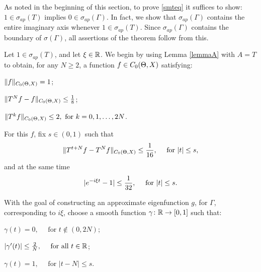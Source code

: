 \begin{pf} As noted in the beginning of this section,  to prove
\eqref{smteq} it suffices to show: $1\in\sigma_{ap}(T)$ implies
$0\in\sigma_{ap}(\Gamma)$.  In fact, we show that
$\sigma_{ap}(\Gamma)$ contains the entire imaginary axis
whenever $1\in\sigma_{ap}(T)$.  Since $\sigma_{ap}(\Gamma)$
contains the boundary of $\sigma(\Gamma)$, all assertions of
the theorem follow from this.

Let $1\in\sigma_{ap}(T)$, and let $\xi\in{\Bbb{R}}$.  We begin by using
Lemma \ref{lemmaA} with $A=T$ to obtain, for any $N\ge 2$, a function
$f\in C_0(\Theta,X)$ satisfying:
\addtocounter{equation}{1}  %
\begin{list}{(\theequation{})}{}
\item $\|f\|_{C_0(\Theta,X)} =1$;
\item $\|T^Nf-f\|_{C_0(\Theta,X)} \le {1\over 8}$;
\item $\|T^kf\|_{C_0(\Theta,X)} \le 2,\text{ for } k=0,1,\ldots,2N$.
\end{list}
For this $f$, fix $s\in (0,1)$ such that
\begin{equation}\lb{SMT-2}
\|T^{t+N}f-T^Nf\|_{\co}\le{1\over 16},\quad\text{ for }|t| \le s,
\end{equation}
and at the same time
\begin{equation}\lb{SMT-3}
|e^{-i\xi t}-1|\le{1\over 32},\quad\text{ for }|t| \le s.
\end{equation}


With the goal of constructing an approximate eigenfunction $g$,
for $\Gamma$, corresponding to $i\xi$, choose a smooth
function $\gamma\colon{\Bbb{R}}\to[0,1]$
such that:
\addtocounter{equation}{1} %
\begin{list}{(\theequation{})}{}
\item $\gamma(t) = 0, \quad\text{ for } t\notin (0,2N)$;
\item $|\gamma'(t)|\le {2\over N}, \quad\text{ for all } t\in{\Bbb{R}}$;
\item $\gamma(t) =1, \quad\text{ for } |t-N|\le s$.
\end{list}


\end{pf}
